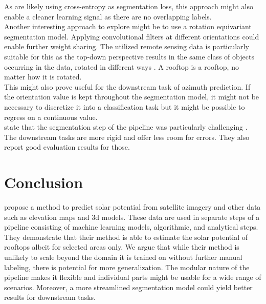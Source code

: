 \documentclass{article} %
\begin{document}
As \citet{de2021predicting} are likely using cross-entropy as segmentation loss, this approach might also enable a cleaner learning signal as there are no overlapping labels.\\
Another interesting approach to explore might be to use a rotation equivariant segmentation model. Applying convolutional filters at different orientations could enable further weight sharing. The utilized remote sensing data is particularly suitable for this as the top-down perspective results in the same class of objects occurring in the data, rotated in different ways \cite{marcos2018land}. A rooftop is a rooftop, no matter how it is rotated.\\
This might also prove useful for the downstream task of azimuth prediction. If the orientation value is kept throughout the segmentation model, it might not be necessary to discretize it into a classification task but it might be possible to regress on a continuous value.\\
\citet{de2021predicting} state that the segmentation step of the pipeline was particularly challenging \cite{Andrieux_2021}. The downstream tasks are more rigid and offer less room for errors. They also report good evaluation results for those.





\section*{Conclusion}
\citet{de2021predicting} propose a method to predict solar potential from satellite imagery and other data such as elevation maps and 3d models. These data are used in separate steps of a pipeline consisting of machine learning models, algorithmic, and analytical steps.\\
They demonstrate that their method is able to estimate the solar potential of rooftops albeit for selected areas only. We argue that while their method is unlikely to scale beyond the domain it is trained on without further manual labeling, there is potential for more generalization. The modular nature of the pipeline makes it flexible and individual parts might be usable for a wide range of scenarios. Moreover, a more streamlined segmentation model could yield better results for downstream tasks.




\newpage



\end{document}

